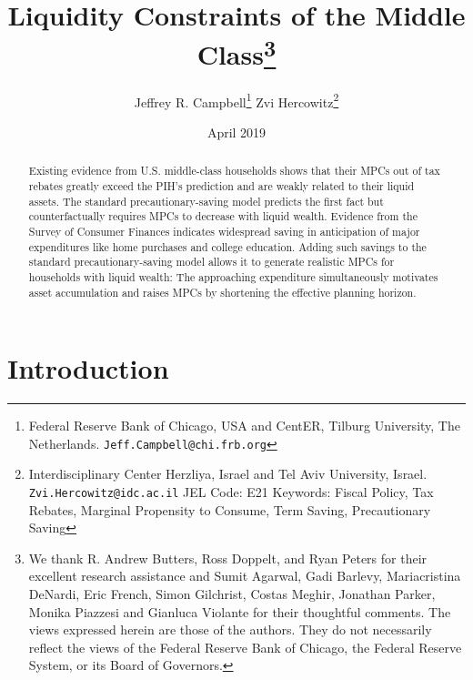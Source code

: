 \documentclass[fleqccn,12pt]{article}
\begin{document}
\title{Liquidity Constraints of the Middle Class\thanks{We thank R. Andrew Butters, Ross Doppelt, and Ryan Peters for their excellent research assistance and Sumit Agarwal, Gadi Barlevy, Mariacristina DeNardi, Eric French, Simon Gilchrist, Costas Meghir, Jonathan Parker, Monika Piazzesi and Gianluca Violante for their thoughtful comments. The views expressed herein are those of the authors. They do not necessarily reflect the views of the Federal Reserve Bank of Chicago, the Federal Reserve System, or its Board of Governors.}}
\author{Jeffrey R. Campbell\thanks{Federal Reserve Bank of Chicago, USA and CentER, Tilburg University, The Netherlands. \texttt{Jeff.Campbell@chi.frb.org}} \hspace{24pt} Zvi Hercowitz\thanks{Interdisciplinary Center Herzliya, Israel and Tel Aviv University, Israel.  \texttt{Zvi.Hercowitz@idc.ac.il} \medskip\newline JEL Code: E21
\newline Keywords: Fiscal Policy, Tax Rebates, Marginal Propensity to Consume, Term Saving, Precautionary Saving} }
\date{April 2019}

\maketitle
\thispagestyle{empty}
\setcounter{page}{0}
\begin{abstract}
Existing evidence from U.S. middle-class households shows that their MPCs out of tax rebates greatly exceed the PIH's prediction and are weakly related to their liquid assets. The standard precautionary-saving model predicts the first fact but counterfactually requires MPCs to decrease with liquid wealth. Evidence from the Survey of Consumer Finances indicates widespread saving in anticipation of major expenditures like home purchases and college education. Adding such savings to the standard precautionary-saving model allows it to generate realistic MPCs for households with liquid wealth: The approaching expenditure simultaneously motivates asset accumulation and raises MPCs by shortening the effective planning horizon.  
\end{abstract}

\newpage

\section{Introduction}
\end{document}
